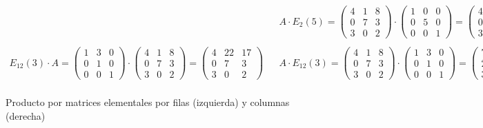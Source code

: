 \begin{figure}[h!]
\[\begin{array}{ccc}
		&&

		A \cdot E_{2}(5) =
		\begin{pmatrix}
			4 & 1 & 8 \\
			0 & 7 & 3 \\
			3 & 0 & 2
		\end{pmatrix}
		\cdot
		\begin{pmatrix}
			1 & 0 & 0 \\
			0 & 5 & 0 \\
			0 & 0 & 1
		\end{pmatrix}
		=
		\begin{pmatrix}
			4 & 5  & 8 \\
			0 & 35 & 3 \\
			3 & 0  & 2
		\end{pmatrix}

		\\&&\\

		E_{12}(3) \cdot A =
		\begin{pmatrix}
			1 & 3 & 0 \\
			0 & 1 & 0 \\
			0 & 0 & 1
		\end{pmatrix}
		\cdot
		\begin{pmatrix}
			4 & 1 & 8 \\
			0 & 7 & 3 \\
			3 & 0 & 2
		\end{pmatrix}
		=
		\begin{pmatrix}
			4 & 22 & 17 \\
			0 & 7  & 3  \\
			3 & 0  & 2
		\end{pmatrix}

		&&

		A \cdot E_{12}(3) =
		\begin{pmatrix}
			4 & 1 & 8 \\
			0 & 7 & 3 \\
			3 & 0 & 2
		\end{pmatrix}
		\cdot
		\begin{pmatrix}
			1 & 3 & 0 \\
			0 & 1 & 0 \\
			0 & 0 & 1
		\end{pmatrix}
		=
		\begin{pmatrix}
			7  & 1 & 8 \\
			21 & 7 & 3 \\
			3  & 0 & 2
		\end{pmatrix}

		\\
	\end{array}
\]
\caption{Producto por matrices elementales por filas (izquierda) y columnas (derecha)}
\end{figure}

